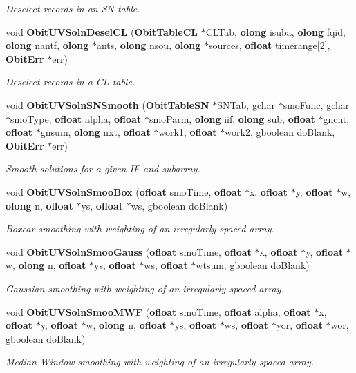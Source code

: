 \begin{CompactItemize}
\begin{CompactList}\small\item\em Deselect records in an SN table. \item\end{CompactList}\item 
void {\bf Obit\-UVSoln\-Desel\-CL} ({\bf Obit\-Table\-CL} $\ast$CLTab, {\bf olong} isuba, {\bf olong} fqid, {\bf olong} nantf, {\bf olong} $\ast$ants, {\bf olong} nsou, {\bf olong} $\ast$sources, {\bf ofloat} timerange[2], {\bf Obit\-Err} $\ast$err)
\begin{CompactList}\small\item\em Deselect records in a CL table. \item\end{CompactList}\item 
void {\bf Obit\-UVSoln\-SNSmooth} ({\bf Obit\-Table\-SN} $\ast$SNTab, gchar $\ast$smo\-Func, gchar $\ast$smo\-Type, {\bf ofloat} alpha, {\bf ofloat} $\ast$smo\-Parm, {\bf olong} iif, {\bf olong} sub, {\bf ofloat} $\ast$gncnt, {\bf ofloat} $\ast$gnsum, {\bf olong} nxt, {\bf ofloat} $\ast$work1, {\bf ofloat} $\ast$work2, gboolean do\-Blank, {\bf Obit\-Err} $\ast$err)
\begin{CompactList}\small\item\em Smooth solutions for a given IF and subarray. \item\end{CompactList}\item 
void {\bf Obit\-UVSoln\-Smoo\-Box} ({\bf ofloat} smo\-Time, {\bf ofloat} $\ast$x, {\bf ofloat} $\ast$y, {\bf ofloat} $\ast$w, {\bf olong} n, {\bf ofloat} $\ast$ys, {\bf ofloat} $\ast$ws, gboolean do\-Blank)
\begin{CompactList}\small\item\em Boxcar smoothing with weighting of an irregularly spaced array. \item\end{CompactList}\item 
void {\bf Obit\-UVSoln\-Smoo\-Gauss} ({\bf ofloat} smo\-Time, {\bf ofloat} $\ast$x, {\bf ofloat} $\ast$y, {\bf ofloat} $\ast$w, {\bf olong} n, {\bf ofloat} $\ast$ys, {\bf ofloat} $\ast$ws, {\bf ofloat} $\ast$wtsum, gboolean do\-Blank)
\begin{CompactList}\small\item\em Gaussian smoothing with weighting of an irregularly spaced array. \item\end{CompactList}\item 
void {\bf Obit\-UVSoln\-Smoo\-MWF} ({\bf ofloat} smo\-Time, {\bf ofloat} alpha, {\bf ofloat} $\ast$x, {\bf ofloat} $\ast$y, {\bf ofloat} $\ast$w, {\bf olong} n, {\bf ofloat} $\ast$ys, {\bf ofloat} $\ast$ws, {\bf ofloat} $\ast$yor, {\bf ofloat} $\ast$wor, gboolean do\-Blank)
\begin{CompactList}\small\item\em Median Window smoothing with weighting of an irregularly spaced array. \item\end{CompactList}\end{CompactItemize}


